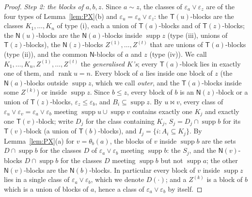 \documentclass[11pt]{amsart}
\theoremstyle{definition}
\newcommand{\supp}{\operatorname{supp}}
\newcommand{\T}{\mathsf{T}}
\newcommand{\N}{\mathsf{N}}
\newcommand{\rk}{\operatorname{rank}}
\newcommand{\mt}{\bowtie}   %
\begin{document}
\begin{proof}
\smallskip\emph{Step 2: the blocks of $a,b,z$.} Since $a\sim z$, the classes of $\varepsilon_a\vee\varepsilon_z$ are of the four types of Lemma~\ref{lem:PX}(b) and $\varepsilon_u=\varepsilon_a\vee\varepsilon_z$: the $\T(u)$-blocks are the classes $K_1,\dots,K_n$ of type (i), each a union of $\T(a)$-blocks and of $\T(z)$-blocks; the $\N(u)$-blocks are the $\N(a)$-blocks inside $\supp z$ (type (iii), unions of $\T(z)$-blocks), the $\N(z)$-blocks $Z^{(1)},\dots,Z^{(t)}$ that are unions of $\T(a)$-blocks (type (ii)), and the common $\N$-blocks of $a$ and $z$ (type (iv)). We call $K_1,\dots,K_n,Z^{(1)},\dots,Z^{(t)}$ the \emph{generalised $K$'s}; every $\T(a)$-block lies in exactly one of them, and $\rk u=n$. Every block of $a$ lies inside one block of $z$ (the $\N(a)$-blocks outside $\supp z$, which we call \emph{outer}, and the $\T(a)$-blocks inside some $Z^{(k)}$) or inside $\supp z$. Since $b\le z$, every block of $b$ is an $\N(z)$-block or a union of $\T(z)$-blocks, $\varepsilon_z\le\varepsilon_b$, and $B_i\subseteq\supp z$. By $u\mt v$, every class of $\varepsilon_u\vee\varepsilon_v=\varepsilon_a\vee\varepsilon_b$ meeting $\supp u\cup\supp v$ contains exactly one $K_j$ and exactly one $\T(v)$-block; write $D_j$ for the class containing $K_j$, $S_j=D_j\cap\supp b$ for its $\T(v)$-block (a union of $\T(b)$-blocks), and $I_j=\{i:A_i\subseteq K_j\}$. By Lemma~\ref{lem:PX}(a) for $v=\theta_b(a)$, the blocks of $v$ inside $\supp b$ are the sets $D\cap\supp b$ for the classes $D$ of $\varepsilon_a\vee\varepsilon_b$ meeting $\supp b$: the $S_j$, and the $\N(v)$-blocks $D\cap\supp b$ for the classes $D$ meeting $\supp b$ but not $\supp a$; the other $\N(v)$-blocks are the $\N(b)$-blocks. In particular every block of $v$ inside $\supp z$ lies in a single class of $\varepsilon_a\vee\varepsilon_b$, which we denote $D(\cdot)$; and a $Z^{(k)}$ is a block of $b$ which is a union of blocks of $a$, hence a class of $\varepsilon_a\vee\varepsilon_b$ by itself.


\end{proof}
\end{document}
